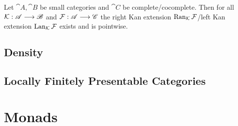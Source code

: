 	\begin{lemma}
		Let $\cat{A},\cat{B}$ be small categories and $\cat{C}$ be complete/cocomplete. Then for all $\mathcal{K}:\mathscr{A} --> \mathscr{B}$ and $\mathcal{F}:\mathscr{A}-->\mathscr{C}$ the right Kan extension $\operatorname{Ran}_{\mathcal{K}}\mathcal{F}$/left Kan extension $\operatorname{Lan}_{\mathcal{K}}\mathcal{F}$ exists and is pointwise.
	\end{lemma}

	\subsection{Density}

	\subsection{Locally Finitely Presentable Categories}

	\newpage
	\section{Monads}
